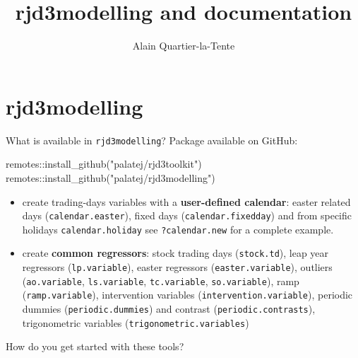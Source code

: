 \documentclass[10pt,xcolor=table,color={dvipsnames,usenames},ignorenonframetext,usepdftitle=false,french]{beamer}
\title{rjd3modelling and documentation}
\author{Alain Quartier-la-Tente}
\date{}
\newenvironment{Shaded}{\begin{snugshade}}{\end{snugshade}}
\newcommand{\FunctionTok}[1]{\textcolor[rgb]{0.00,0.00,0.00}{#1}}
\newcommand{\NormalTok}[1]{#1}
\newcommand{\SpecialCharTok}[1]{\textcolor[rgb]{0.00,0.00,0.00}{#1}}
\newcommand{\StringTok}[1]{\textcolor[rgb]{0.31,0.60,0.02}{#1}}
\providecommand{\tightlist}{%
  \setlength{\parskip}{0pt}
  }
\begin{document}
\begin{frame}
\titlepage
\end{frame}

\hypertarget{rjd3modelling}{%
\section{rjd3modelling}\label{rjd3modelling}}

\begin{frame}[fragile]{What is available in \texttt{rjd3modelling}?}
\protect\hypertarget{what-is-available-in-rjd3modelling}{}
Package available on GitHub:

\begin{Shaded}
\begin{Highlighting}[]
\NormalTok{remotes}\SpecialCharTok{::}\FunctionTok{install\_github}\NormalTok{(}\StringTok{"palatej/rjd3toolkit"}\NormalTok{)}
\NormalTok{remotes}\SpecialCharTok{::}\FunctionTok{install\_github}\NormalTok{(}\StringTok{"palatej/rjd3modelling"}\NormalTok{)}
\end{Highlighting}
\end{Shaded}

\pause

\begin{itemize}
\tightlist
\item
  create trading-days variables with a \textbf{user-defined calendar}:
  easter related days (\texttt{calendar.easter}), fixed days
  (\texttt{calendar.fixedday}) and from specific holidays
  \texttt{calendar.holiday} \faArrowCircleRight{} see
  \texttt{?calendar.new} for a complete example.
\end{itemize}

\pause

\begin{itemize}
\tightlist
\item
  create \textbf{common regressors}: stock trading days
  (\texttt{stock.td}), leap year regressors (\texttt{lp.variable}),
  easter regressors (\texttt{easter.variable}), outliers
  (\texttt{ao.variable}, \texttt{ls.variable}, \texttt{tc.variable},
  \texttt{so.variable}), ramp (\texttt{ramp.variable}), intervention
  variables (\texttt{intervention.variable}), periodic dummies
  (\texttt{periodic.dummies}) and contrast
  (\texttt{periodic.contrasts}), trigonometric variables
  (\texttt{trigonometric.variables})
\end{itemize}

\pause

\bcquestion How do you get started with these tools?
\end{frame}
\end{document}

